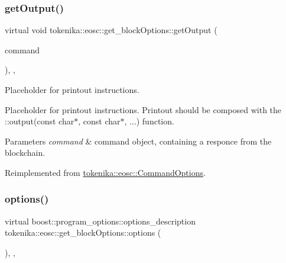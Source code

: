 \subsubsection{\texorpdfstring{get\+Output()}{getOutput()}}
{\footnotesize\ttfamily virtual void tokenika\+::eosc\+::get\+\_\+block\+Options\+::get\+Output (\begin{DoxyParamCaption}\item[{\hyperlink{classtokenika_1_1eosc_1_1_eosc_command}{Eosc\+Command}}]{command }\end{DoxyParamCaption})\hspace{0.3cm}{\ttfamily [inline]}, {\ttfamily [protected]}, {\ttfamily [virtual]}}



Placeholder for printout instructions. 

Placeholder for printout instructions. Printout should be composed with the \+::output(const char$\ast$, const char$\ast$, ...) function.


\begin{DoxyParams}{Parameters}
{\em command} & command object, containing a responce from the blockchain. \\
\hline
\end{DoxyParams}


Reimplemented from \hyperlink{classtokenika_1_1eosc_1_1_command_options_a346dcfb00b8ac522169714544bfa7be0}{tokenika\+::eosc\+::\+Command\+Options}.

\mbox{\label{classtokenika_1_1eosc_1_1get__block_options_a4071310fa888b0e7184648bd62e6eb41}} 
\subsubsection{\texorpdfstring{options()}{options()}}
{\footnotesize\ttfamily virtual boost\+::program\+\_\+options\+::options\+\_\+description tokenika\+::eosc\+::get\+\_\+block\+Options\+::options (\begin{DoxyParamCaption}{ }\end{DoxyParamCaption})\hspace{0.3cm}{\ttfamily [inline]}, {\ttfamily [protected]}, {\ttfamily [virtual]}}



